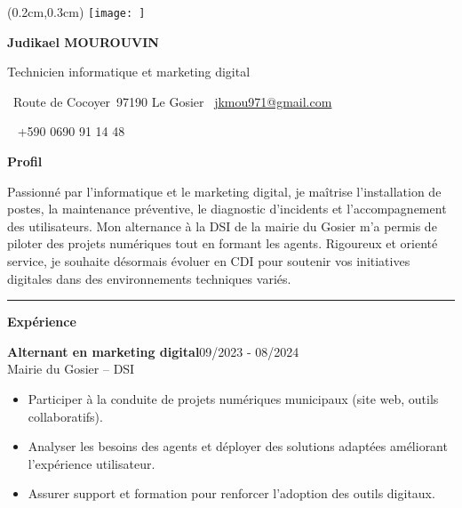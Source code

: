 \documentclass[a4paper]{article}
\renewcommand{\colorbox}[2]{#2}%
\newcommand{\fullrule}{\hspace{-1.5cm}\rule{\paperwidth}{0.4pt}}
\newcommand{\cvsection}[1]{%
  \vspace{6pt}\textbf{\Large #1}\par\vspace{2pt}}
\begin{document}
\color{white}
\ifx\relax\relax\else
\begin{textblock*}{4cm}(0.2cm,0.3cm)
  \texttt{[image: ]}
\end{textblock*}
 \fi
\begin{center}
  {\fontsize{44pt}{24pt}\selectfont\bfseries Judikael MOUROUVIN}

  \bigskip
  {\Large Technicien informatique et marketing digital}

  \bigskip\bigskip
  \faMapMarker~Route de Cocoyer\ 97190 Le Gosier
  \quad\faEnvelope~\href{mailto:jkmou971@gmail.com}{jkmou971@gmail.com}

  \bigskip
  \faPhone~ +590 0690 91 14 48
  \quad \faLinkedin\ \href{}{}
 

  \vspace{-0.3cm}
  
\end{center}
\cvsection{Profil}

Passionné par l’informatique et le marketing digital, je maîtrise l’installation de postes, la maintenance préventive, le diagnostic d’incidents et l’accompagnement des utilisateurs. Mon alternance à la DSI de la mairie du Gosier m’a permis de piloter des projets numériques tout en formant les agents. Rigoureux et orienté service, je souhaite désormais évoluer en CDI pour soutenir vos initiatives digitales dans des environnements techniques variés.

\medskip\fullrule

\cvsection{Expérience}
\colorbox{maincolor}{%
  \begin{minipage}{\linewidth}
    \noindent
    \textbf{Alternant en marketing digital}\hfill 09/2023 - 08/2024\\
    Mairie du Gosier – DSI\\[-0.3em]
    \begin{itemize}[leftmargin=*]
      \item Participer à la conduite de projets numériques municipaux (site web, outils collaboratifs). \item Analyser les besoins des agents et déployer des solutions adaptées améliorant l’expérience utilisateur. \item Assurer support et formation pour renforcer l’adoption des outils digitaux.
    \end{itemize}
  \end{minipage}}
\end{document}
